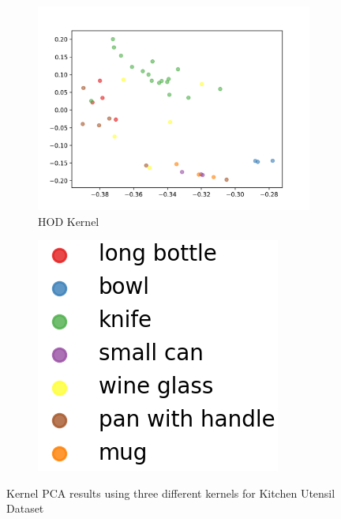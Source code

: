 \documentclass[10pt]{article}
\begin{document}
\begin{figure}[H]
\begin{subfigure}[h]{0.28\textwidth}
        \includegraphics[width=\linewidth]{DB_hod}
        \caption{HOD Kernel}
    \end{subfigure}%
    \begin{subfigure}[h]{0.1\textwidth}
        \includegraphics[width=\linewidth]{DB_legend}
    \end{subfigure}%
    \caption{Kernel PCA results using three different kernels for Kitchen Utensil Dataset}
    \label{fig:db_kernels}
\end{figure}
\end{document}
